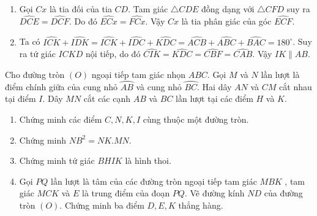 \begin{bt}
{\begin{enumerate}
\item Gọi $Cx$ là tia đối của tia $CD$. Tam giác $\triangle CDE$ đồng dạng với $\triangle CFD$ suy ra $\widehat{DCE}=\widehat{DCF}$. Do đó $\widehat{ECx}=\widehat{FCx}$. Vậy $Cx$ là tia phân giác của góc $\widehat{ECF}$.
\item Ta có $\widehat{ICK}+\widehat{IDK}=\widehat{ICK}+\widehat{IDC}+\widehat{KDC}=\widehat{ACB}+\widehat{ABC}+\widehat{BAC}=180^\circ$. Suy ra tứ giác $ICKD$ nội tiếp, do đó $\widehat{CIK}=\widehat{KDC}=\widehat{CBF}=\widehat{CAB}$. Vậy $IK\parallel AB$.
\end{enumerate}
}
\end{bt}

\begin{bt}
    Cho đường tròn $(O)$ ngoại tiếp tam giác nhọn $ABC$. Gọi $M$ và $N$ lần lượt là điểm chính giữa của cung nhỏ $\wideparen{AB}$ và cung nhỏ $\wideparen{BC}$. Hai dây $AN$ và $CM$ cắt nhau tại điểm $I$. Dây $MN$ cắt các cạnh $AB$ và $BC$ lần lượt tại các điểm $H$ và $K$.
    \begin{enumerate}
        \item Chứng minh các điểm $C, N, K, I $ cùng thuộc một đường tròn.
        \item Chứng minh $NB^2=NK.MN$.
        \item Chứng minh tứ giác $BHIK$ là hình thoi.
        \item Gọi $PQ$ lần lượt là tâm của các đường tròn ngoại tiếp tam giác $MBK$ , tam giác $MCK$ và $E$ là trung điểm của đoạn $PQ$. Vẽ đường kính $ND$ của đường tròn $(O)$. Chứng minh ba điểm $D,E,K$ thẳng hàng.
    \end{enumerate}
    \loigiai
    {
   }
\end{bt}
